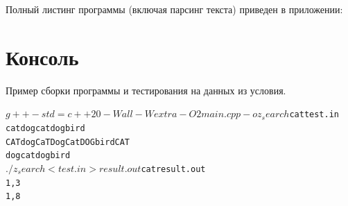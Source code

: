 Полный листинг программы (включая парсинг текста) приведен в приложении:


\pagebreak

\section{Консоль}
Пример сборки программы и тестирования на данных из условия.

\begin{alltt}
$ g++ -std=c++20 -Wall -Wextra -O2 main.cpp -o z_search
$ cat test.in
cat dog cat dog bird
CAT dog CaT Dog Cat DOG bird CAT
dog cat dog bird
$ ./z_search < test.in > result.out
$ cat result.out
1, 3
1, 8
\end{alltt}
\pagebreak